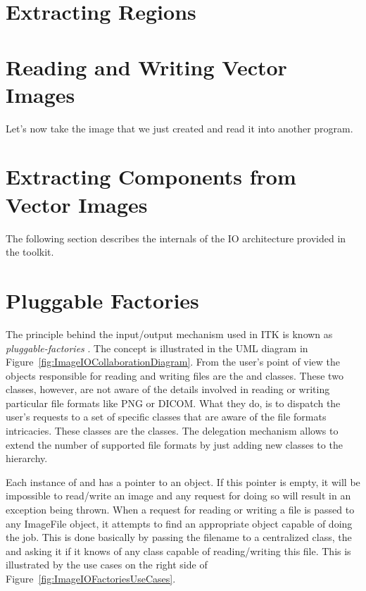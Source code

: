 \section{Extracting Regions}
\label{sec:ImagReadExtractWrite}





\section{Reading and Writing Vector Images}
\label{sec:VectorImagReadWrite}



Let's now take the image that we just created and read it into another program.




\section{Extracting Components from Vector Images}
\label{sec:VectorImageExtractComponent}




The following section describes the internals of the IO architecture provided
in the toolkit.

\section{Pluggable Factories}
\label{sec:ImageIOPluggableFactories}

The principle behind the input/output mechanism used in ITK is known as
\emph{pluggable-factories} \cite{Gamma1995}. The concept is illustrated in the
UML diagram in Figure~\ref{fig:ImageIOCollaborationDiagram}. From the user's
point of view the objects responsible for reading and writing files are the
 and  classes. These two
classes, however, are not aware of the details involved in reading or writing
particular file formats like PNG or DICOM.  What they do, is to dispatch the
user's requests to a set of specific classes that are aware of the file formats
intricacies. These classes are the  classes. The delegation
mechanism allows to extend the number of supported file formats by just adding
new classes to the  hierarchy.

Each instance of  and  has a
pointer to an  object. If this pointer is empty, it will be
impossible to read/write an image and any request for doing so will result in
an exception being thrown. When a request for reading or writing a file is
passed to any ImageFile object, it attempts to find an appropriate
 object capable of doing the job. This is done basically by
passing the filename to a centralized class, the  and
asking it if it knows of any  class capable of reading/writing
this file. This is illustrated by the use cases on the right side of
Figure~\ref{fig:ImageIOFactoriesUseCases}.

